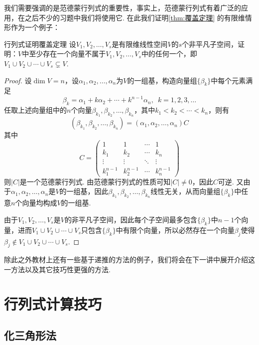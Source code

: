  我们需要强调的是范德蒙行列式的重要性，事实上，范德蒙行列式有着广泛的应用，在之后不少的习题中我们将使用它. 在此我们证明\autoref{thm:覆盖定理} 的有限维情形作为一个例子：
\begin{example}{}{行列式证明覆盖定理}
    设$V_1,V_2,\ldots,V_s$是有限维线性空间$V$的$s$个非平凡子空间，证明：$V$中至少存在一个向量不属于$V_1,V_2,\ldots,V_s$中的任何一个，即$V_1 \cup V_2 \cup \cdots \cup V_s\subsetneq V$.
\end{example}

\begin{proof}
    设$\dim V=n$，设$\alpha_1,\alpha_2,\ldots,\alpha_n$为$V$的一组基，构造向量组$\{\beta_k\}$中每个元素满足
    \[\beta_k=\alpha_1+k\alpha_2+\cdots+k^{n-1}\alpha_n,\enspace k=1,2,3,\ldots\]
    任取上述向量组中的$n$个向量$\beta_{k_1},\beta_{k_2},\ldots,\beta_{k_n}$，其中$k_1<k_2<\cdots<k_n$，则有
    \[(\beta_{k_1},\beta_{k_2},\ldots,\beta_{k_n})=(\alpha_1,\alpha_2,\ldots,\alpha_n)C\]
    其中
    \[C=\begin{pmatrix}
            1         & 1         & \cdots & 1         \\
            k_1       & k_2       & \cdots & k_n       \\
            \vdots    & \vdots    & \ddots & \vdots    \\
            k_1^{n-1} & k_2^{n-1} & \cdots & k_n^{n-1}
        \end{pmatrix}\]
    则$|C|$是一个范德蒙行列式. 由范德蒙行列式的性质可知$|C| \neq 0$，因此$C$可逆. 又由于$\alpha_1,\alpha_2,\ldots,\alpha_n$是$V$的一组基，因此$\beta_{k_1},\beta_{k_2},\ldots,\beta_{k_n}$线性无关，从而向量组$\{\beta_k\}$中任意$n$个向量均构成$V$的一组基.

    由于$V_1,V_2,\ldots,V_s$是$V$的非平凡子空间，因此每个子空间最多包含$\{\beta_k\}$中$n-1$个向量，进而$V_1\cup V_2\cup\cdots\cup V_s$只包含$\{\beta_k\}$中有限个向量，所以必然存在一个向量$\beta_j$使得$\beta_j \notin V_1\cup V_2\cup\cdots\cup V_s$.
\end{proof}

除此之外教材上还有一些基于递推的方法的例子，我们将会在下一讲中展开介绍这一方法以及其它技巧性更强的方法.

\section{行列式计算技巧}

\subsection{化三角形法}

